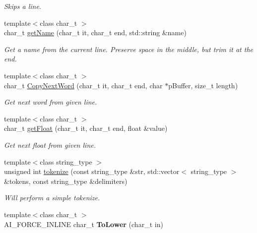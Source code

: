 \begin{DoxyCompactItemize}
\begin{DoxyCompactList}\small\item\em Skips a line. \end{DoxyCompactList}\item 
{\footnotesize template$<$class char\+\_\+t $>$ }\\char\+\_\+t \hyperlink{namespace_assimp_a0f8daeb06b4e861a2152c33413e6eae1}{get\+Name} (char\+\_\+t it, char\+\_\+t end, std\+::string \&name)
\begin{DoxyCompactList}\small\item\em Get a name from the current line. Preserve space in the middle, but trim it at the end. \end{DoxyCompactList}\item 
{\footnotesize template$<$class char\+\_\+t $>$ }\\char\+\_\+t \hyperlink{namespace_assimp_a9fa5e810cd3a03f8f0b9b232a9c2adb9}{Copy\+Next\+Word} (char\+\_\+t it, char\+\_\+t end, char $\ast$p\+Buffer, size\+\_\+t length)
\begin{DoxyCompactList}\small\item\em Get next word from given line. \end{DoxyCompactList}\item 
{\footnotesize template$<$class char\+\_\+t $>$ }\\char\+\_\+t \hyperlink{namespace_assimp_a3a64f936048746e10d0aa50e3eee9099}{get\+Float} (char\+\_\+t it, char\+\_\+t end, float \&value)
\begin{DoxyCompactList}\small\item\em Get next float from given line. \end{DoxyCompactList}\item 
{\footnotesize template$<$class string\+\_\+type $>$ }\\unsigned int \hyperlink{namespace_assimp_add92ce34a50273a4d925ec78a7fc658a}{tokenize} (const string\+\_\+type \&str, std\+::vector$<$ string\+\_\+type $>$ \&tokens, const string\+\_\+type \&delimiters)
\begin{DoxyCompactList}\small\item\em Will perform a simple tokenize. \end{DoxyCompactList}\item 
\hypertarget{namespace_assimp_a1885e8fcc335cbb5e9e2498ddbda7ea9}{{\footnotesize template$<$class char\+\_\+t $>$ }\\A\+I\+\_\+\+F\+O\+R\+C\+E\+\_\+\+I\+N\+L\+I\+N\+E char\+\_\+t {\bfseries To\+Lower} (char\+\_\+t in)}\label{namespace_assimp_a1885e8fcc335cbb5e9e2498ddbda7ea9}


\end{DoxyCompactItemize}
